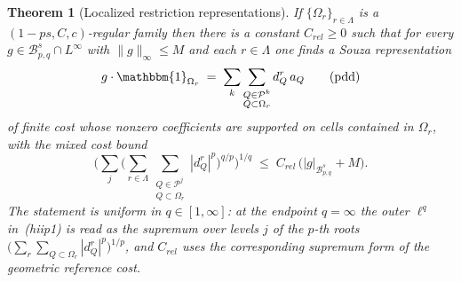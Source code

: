 \documentclass[11pt]{amsart}
\newtheorem{theorem}{Theorem}[section]
\theoremstyle{definition}
\begin{document}
\begin{theorem}[Localized restriction representations]\label{cfpdd}
If $\{\Omega_r\}_{r \in \Lambda}$ is a $(1-ps, C, c)$-regular family then
there is a constant $C_{rel} \geq 0$ such that for every $g \in
\mathcal{B}^s_{p,q} \cap L^\infty$ with $\|g\|_\infty \leq M$ and each $r \in
\Lambda$ one finds a Souza representation
\begin{equation*}
g \cdot \mathbbm{1}_{\Omega_r}
\;=\; \sum_k \sum_{\substack{Q \in \mathcal{P}^k \\ Q \subset \Omega_r}}
d_Q^r\, a_Q
\tag{pdd}
\end{equation*}
of finite cost whose nonzero coefficients are supported on cells contained in
$\Omega_r$, with the mixed cost bound
\begin{equation*}
\Big( \sum_j \big( \sum_{r \in \Lambda}
\sum_{\substack{Q \in \mathcal{P}^j \\ Q \subset \Omega_r}}
|d_Q^r|^p \big)^{q/p} \Big)^{1/q}
\;\leq\; C_{rel}\, \big(|g|_{\mathcal{B}^s_{p,q}} + M\big).
\tag{hiip1}
\end{equation*}
The statement is uniform in $q \in [1, \infty]$: at the endpoint $q = \infty$
the outer $\ell^q$ in~(hiip1) is read as the supremum over levels $j$ of the
$p$-th roots $\big(\sum_r \sum_{Q \subset \Omega_r} |d_Q^r|^p\big)^{1/p}$, and
$C_{rel}$ uses the corresponding supremum form of the geometric reference cost.
\end{theorem}
\end{document}
